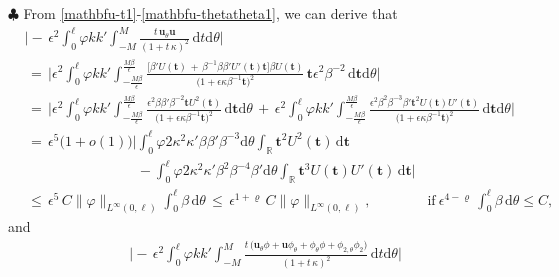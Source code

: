 \documentclass[10pt, reqno]{amsart}
\numberwithin{equation}{section}
\theoremstyle{definition}
\begin{document}
{{\smallskip
\noindent$\clubsuit$
From \eqref{mathbfu-t1}-\eqref{mathbfu-thetatheta1}, we can derive that
\begin{align*}
 &\Bigg|-\, \epsilon^2 \int_0^\ell \varphi kk'\int_{-M}^{M} \frac{t\,{\mathbf u}_{\theta}
 {\mathbf u}}{(1+t\,\kappa)^2}
 \,{\mathrm d}t{\mathrm d}\theta\Bigg|
\nonumber\\[2mm]
 &\,=\,\Bigg|\epsilon^2\int_0^\ell \varphi kk' \displaystyle\int_{-\frac{M\beta}{\epsilon}}^{\frac{M\beta}{\epsilon}}
 \frac{\big[\beta' U({\mathbf t})
 \,+\, \beta^{-1}\beta \beta' U'({\mathbf t}){\mathbf t}\big]\beta U({\mathbf t})}{\big(1+\epsilon \kappa \beta^{-1}{\mathbf t}\big)^2}
 \,{\mathbf t}\epsilon^2 \beta^{-2} \,{\mathrm d}{\mathbf t}{\mathrm d}\theta\Bigg|
\nonumber\\[2mm]
 &\,=\,\Bigg|\epsilon^2\int_0^\ell \varphi kk' \displaystyle\int_{-\frac{M\beta}{\epsilon}}^{\frac{M\beta}{\epsilon}}
 \frac{\epsilon^2 \beta \beta'\beta^{-2}{\mathbf t}U^2({\mathbf t})}{\big(1+\epsilon \kappa \beta^{-1}{\mathbf t}\big)^2}
 \,{\mathrm d}{\mathbf t}{\mathrm d}\theta
 \,+\,
 \epsilon^2\int_0^\ell \varphi kk' \displaystyle\int_{-\frac{M\beta}{\epsilon}}^{\frac{M\beta}{\epsilon}}
 \frac{\epsilon^2 \beta^2 \beta^{-3}\beta'{\mathbf t}^2 U({\mathbf t})U'({\mathbf t})}{\big(1+\epsilon \kappa \beta^{-1}{\mathbf t}\big)^2}
 \,{\mathrm d}{\mathbf t}{\mathrm d}\theta\Bigg|
\nonumber\\[2mm]
 &\,=\,\epsilon^5\big(1+o(1)\big)\Bigg|\int_0^\ell \varphi 2\kappa^2\kappa'\beta \beta'\beta^{-3} {\mathrm d}\theta \int_{\mathbb R} {\mathbf t}^2U^2({\mathbf t}) \,{\mathrm d}{\mathbf t}
\nonumber\\[2mm]
 &\qquad\qquad\qquad\qquad
 -\int_0^\ell \varphi 2\kappa^2\kappa' \beta^2 \beta^{-4}\beta' {\mathrm d}\theta \int_{\mathbb R} {\mathbf t}^3 U({\mathbf t})U'({\mathbf t}) \,{\mathrm d}{\mathbf t}\Bigg|
\nonumber\\[2mm]
 &\,\leq\, \epsilon^5\,C \|\varphi\|_{L^\infty(0,\ell)} \int_0^\ell \beta\,{\mathrm d}\theta
 \,\leq\, \epsilon^{1+\varrho}\,C \|\varphi\|_{L^\infty(0,\ell)},
 \qquad\qquad \mbox{if}\ \epsilon^{4-\varrho}\,\int_0^\ell \beta\,{\mathrm d}\theta\leq C,
\end{align*}
 and
\begin{align*}
 &\Bigg|-\, \epsilon^2 \int_0^\ell \varphi kk'\int_{-M}^{M}
 \frac{t\,\big({\mathbf u}_{\theta}\phi+{\mathbf u}\phi_{\theta} +\phi_{\theta}\phi+\phi_{2,\theta}\phi_{2}\big)}
 {(1+t\,\kappa)^2}
 \,{\mathrm d}t{\mathrm d}\theta\Bigg|
\nonumber\\[2mm]

\end{align*}}}
\end{document}

